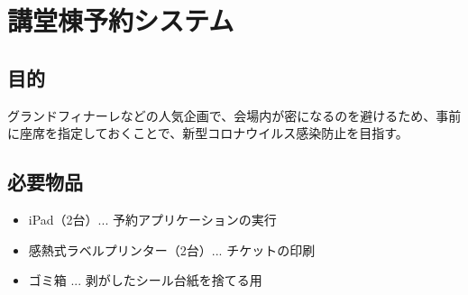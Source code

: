 \documentclass[a4paper]{ltjsreport}
\begin{document}
\section{講堂棟予約システム}
\subsection{目的}
グランドフィナーレなどの人気企画で、会場内が密になるのを避けるため、事前に座席を指定しておくことで、新型コロナウイルス感染防止を目指す。
\subsection{必要物品}
\begin{itemize}
  \item iPad（2台）... 予約アプリケーションの実行
  \item 感熱式ラベルプリンター（2台）... チケットの印刷
  \item ゴミ箱 ... 剥がしたシール台紙を捨てる用
\end{itemize}
\end{document}
